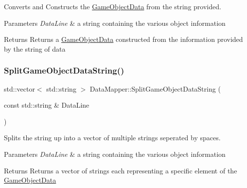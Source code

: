 Converts and Constructs the \hyperlink{struct_game_object_data}{Game\+Object\+Data} from the string provided. 


\begin{DoxyParams}{Parameters}
{\em Data\+Line} & a string containing the various object information \\
\hline
\end{DoxyParams}
\begin{DoxyReturn}{Returns}
Returns a \hyperlink{struct_game_object_data}{Game\+Object\+Data} constructed from the information provided by the string of data 
\end{DoxyReturn}
\mbox{\label{class_data_mapper_a296af9345fd16e4397251efef8726a74}} 
\subsubsection{\texorpdfstring{Split\+Game\+Object\+Data\+String()}{SplitGameObjectDataString()}}
{\footnotesize\ttfamily std\+::vector$<$ std\+::string $>$ Data\+Mapper\+::\+Split\+Game\+Object\+Data\+String (\begin{DoxyParamCaption}\item[{const std\+::string \&}]{Data\+Line }\end{DoxyParamCaption})\hspace{0.3cm}{\ttfamily [private]}}



Splits the string up into a vector of multiple strings seperated by spaces. 


\begin{DoxyParams}{Parameters}
{\em Data\+Line} & a string containing the various object information \\
\hline
\end{DoxyParams}
\begin{DoxyReturn}{Returns}
Returns a vector of strings each representing a specific element of the \hyperlink{struct_game_object_data}{Game\+Object\+Data} 
\end{DoxyReturn}
\mbox{\label{class_data_mapper_af92f7728727500d39ff4aa1d6ca2b81b}} 
